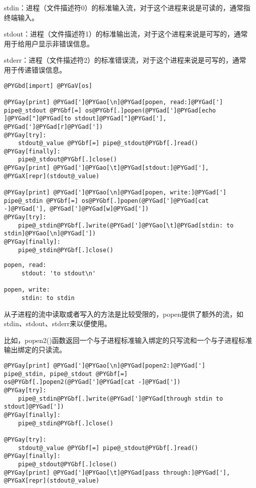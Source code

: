 \documentclass[letterpaper,10pt,english]{manual}
\begin{document}
stdin：进程（文件描述符0）的标准输入流，对于这个进程来说是可读的，通常指终端输入。

stdout：进程（文件描述符1）的标准输出流，对于这个进程来说是可写的，通常用于给用户显示非错误信息。

stderr：进程（文件描述符2）的标准错误流，对于这个进程来说是可写的，通常用于传递错误信息。

\begin{Verbatim}[commandchars=@\[\]]
@PYGbd[import] @PYGaV[os]

@PYGay[print] @PYGad[']@PYGao[\n]@PYGad[popen, read:]@PYGad[']
pipe@_stdout @PYGbf[=] os@PYGbf[.]popen(@PYGad[']@PYGad[echo ]@PYGad["]@PYGad[to stdout]@PYGad["]@PYGad['], @PYGad[']@PYGad[r]@PYGad['])
@PYGay[try]:
    stdout@_value @PYGbf[=] pipe@_stdout@PYGbf[.]read()
@PYGay[finally]:
    pipe@_stdout@PYGbf[.]close()
@PYGay[print] @PYGad[']@PYGao[\t]@PYGad[stdout:]@PYGad['], @PYGaX[repr](stdout@_value)

@PYGay[print] @PYGad[']@PYGao[\n]@PYGad[popen, write:]@PYGad[']
pipe@_stdin @PYGbf[=] os@PYGbf[.]popen(@PYGad[']@PYGad[cat -]@PYGad['], @PYGad[']@PYGad[w]@PYGad['])
@PYGay[try]:
    pipe@_stdin@PYGbf[.]write(@PYGad[']@PYGao[\t]@PYGad[stdin: to stdin]@PYGao[\n]@PYGad['])
@PYGay[finally]:
    pipe@_stdin@PYGbf[.]close()
\end{Verbatim}

\begin{Verbatim}[commandchars=@\[\]]
popen, read:
     stdout: 'to stdout\n'

popen, write:
     stdin: to stdin
\end{Verbatim}

从子进程的流中读取或者写入的方法是比较受限的，popen提供了额外的流，如stdin、stdout、stderr来以便使用。

比如，popen2()函数返回一个与子进程标准输入绑定的只写流和一个与子进程标准输出绑定的只读流。

\begin{Verbatim}[commandchars=@\[\]]
@PYGay[print] @PYGad[']@PYGao[\n]@PYGad[popen2:]@PYGad[']
pipe@_stdin, pipe@_stdout @PYGbf[=] os@PYGbf[.]popen2(@PYGad[']@PYGad[cat -]@PYGad['])
@PYGay[try]:
    pipe@_stdin@PYGbf[.]write(@PYGad[']@PYGad[through stdin to stdout]@PYGad['])
@PYGay[finally]:
    pipe@_stdin@PYGbf[.]close()

@PYGay[try]:
    stdout@_value @PYGbf[=] pipe@_stdout@PYGbf[.]read()
@PYGay[finally]:
    pipe@_stdout@PYGbf[.]close()
@PYGay[print] @PYGad[']@PYGao[\t]@PYGad[pass through:]@PYGad['], @PYGaX[repr](stdout@_value)
\end{Verbatim}
\end{document}
